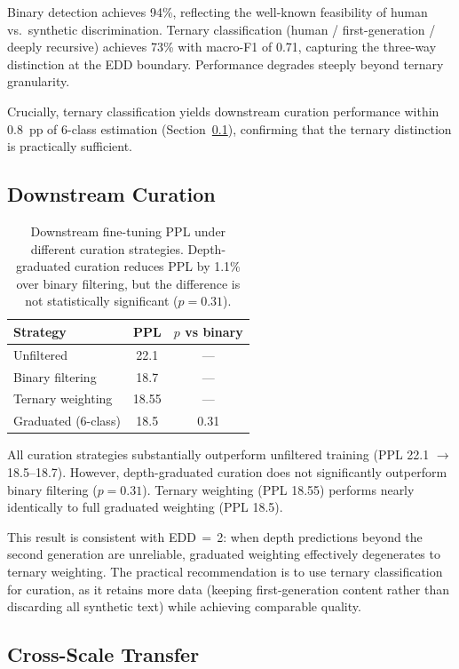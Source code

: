 \documentclass[11pt,a4paper]{article}
\begin{document}
Binary detection achieves 94\%, reflecting the well-known feasibility of human vs.\ synthetic discrimination.
Ternary classification (human / first-generation / deeply recursive) achieves 73\% with macro-F1 of 0.71, capturing the three-way distinction at the EDD boundary.
Performance degrades steeply beyond ternary granularity.

Crucially, ternary classification yields downstream curation performance within 0.8~pp of 6-class estimation (Section~\ref{sec:curation}), confirming that the ternary distinction is practically sufficient.

\subsection{Downstream Curation}
\label{sec:curation}

\begin{table}[t]
\centering
\small
\begin{tabular}{lcc}
\toprule
\textbf{Strategy} & \textbf{PPL} & \textbf{$p$ vs binary} \\
\midrule
Unfiltered & 22.1 & --- \\
Binary filtering & 18.7 & --- \\
Ternary weighting & 18.55 & --- \\
Graduated (6-class) & 18.5 & 0.31 \\
\bottomrule
\end{tabular}
\caption{Downstream fine-tuning PPL under different curation strategies. Depth-graduated curation reduces PPL by 1.1\% over binary filtering, but the difference is not statistically significant ($p=0.31$).}
\label{tab:curation}
\end{table}

All curation strategies substantially outperform unfiltered training (PPL 22.1 $\to$ 18.5--18.7).
However, depth-graduated curation does not significantly outperform binary filtering ($p=0.31$).
Ternary weighting (PPL 18.55) performs nearly identically to full graduated weighting (PPL 18.5).

This result is consistent with EDD\,$=$\,2: when depth predictions beyond the second generation are unreliable, graduated weighting effectively degenerates to ternary weighting.
The practical recommendation is to use ternary classification for curation, as it retains more data (keeping first-generation content rather than discarding all synthetic text) while achieving comparable quality.

\subsection{Cross-Scale Transfer}
\end{document}
